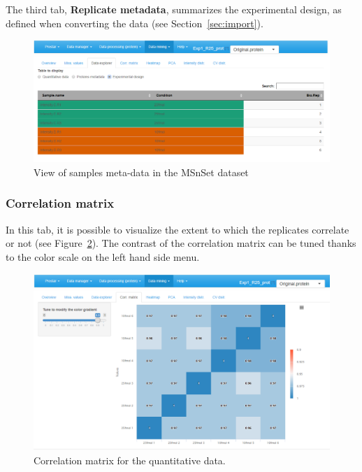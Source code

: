 \documentclass[12pt]{article}
\begin{document}
The third tab, \textbf{Replicate metadata}, summarizes the experimental design, as defined when converting the data (see Section~\ref{sec:import}). 

\begin {figure}
\includegraphics{images/desc_pdata.png}
\caption{View of samples meta-data in the MSnSet dataset}\label{fig:sdqv3}
\end {figure}

\subsubsection {Correlation matrix}

In this tab, it is possible to visualize the extent to which the replicates 
correlate or not (see Figure~\ref{fig:sdcm}). The contrast of the correlation matrix can be tuned thanks to the color scale on the left hand side menu.

\begin {figure}
\includegraphics{images/desc_corrmatrix.png}
\caption{Correlation matrix for the quantitative data.}\label{fig:sdcm}
\end {figure}
\end{document}

